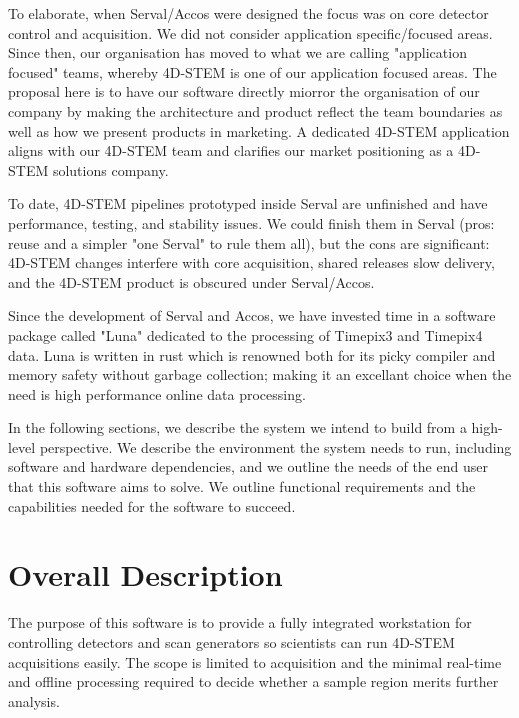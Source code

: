 \documentclass[10pt]{article}
\begin{document}
    To elaborate, when Serval/Accos were designed the focus was on core detector control and acquisition. We did not consider application specific/focused areas. Since then, our organisation has moved to what we are calling "application focused" teams, whereby 4D-STEM is one of our application focused areas. The proposal here is to have our software directly miorror the organisation of our company by making the architecture and product reflect the team boundaries as well as how we present products in marketing. A dedicated 4D-STEM application aligns with our 4D-STEM team and clarifies our market positioning as a 4D-STEM solutions company.

    To date, 4D-STEM pipelines prototyped inside Serval are unfinished and have performance, testing, and stability issues. We could finish them in Serval (pros: reuse and a simpler "one Serval" to rule them all), but the cons are significant: 4D-STEM changes interfere with core acquisition, shared releases slow delivery, and the 4D-STEM product is obscured under Serval/Accos.

    Since the development of Serval and Accos, we have invested time in a software package called "Luna" dedicated to the processing of Timepix3 and Timepix4 data. Luna is written in rust which is renowned both for its picky compiler and memory safety without garbage collection; making it an excellant choice when the need is high performance online data processing.

    In the following sections, we describe the system we intend to build from a high-level perspective. We describe the environment the system needs to run, including software and hardware dependencies, and we outline the needs of the end user that this software aims to solve. We outline functional requirements and the capabilities needed for the software to succeed.


    \section{Overall Description}\label{sec:overall_description}
    The purpose of this software is to provide a fully integrated workstation for controlling detectors and scan generators so scientists can run 4D-STEM acquisitions easily. The scope is limited to acquisition and the minimal real-time and offline processing required to decide whether a sample region merits further analysis.
\end{document}
